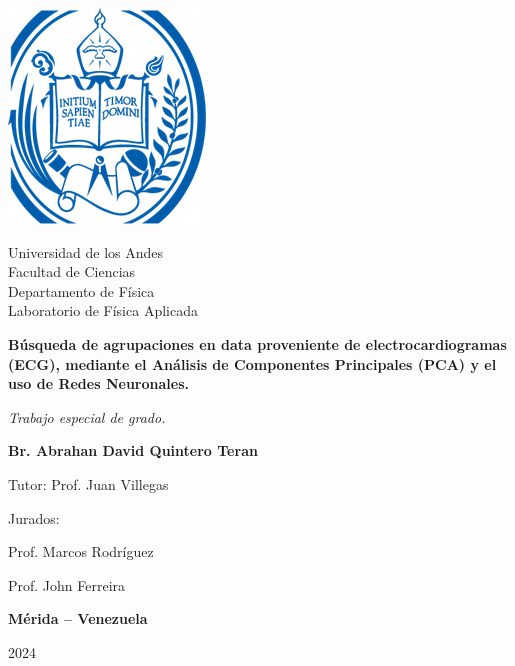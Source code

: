 \documentclass[12pt,letterpaper,oneside,openright]{book}
\begin{document}
\frontmatter
\begin{titlepage}
  \begin{center}
  	{\includegraphics[width=0.35\linewidth]{Sem_1/figuras/ulaLogo}\par}
  	\vspace{1cm}
	\begin{Large}
		Universidad de los Andes \\
		Facultad de Ciencias \\ 
		Departamento de Física \\ 
		Laboratorio de Física Aplicada\par
	\end{Large}
	\vspace{0.7cm}
	\textbf{{\Large Búsqueda de agrupaciones en data proveniente de electrocardiogramas (ECG), mediante el Análisis de Componentes Principales (PCA) y el uso de Redes Neuronales.}}\par
	\vspace{0.5cm}
	{\itshape\large Trabajo especial de grado.}\par
	\vspace{0.5cm}
	{\large\textbf{Br. Abrahan David Quintero Teran}}\par
   	\vspace{0.5cm}
    {\large Tutor: Prof. Juan Villegas}\par
    \vspace{0.5cm}
    \begin{flushright}
    	{\large Jurados: \par
    	Prof. Marcos Rodríguez \par
    	Prof. John Ferreira \par}
    \end{flushright}
    {\large\textbf{Mérida -- Venezuela}} \par
    {\large 2024} %
  \end{center}
\end{titlepage}
\end{document}
